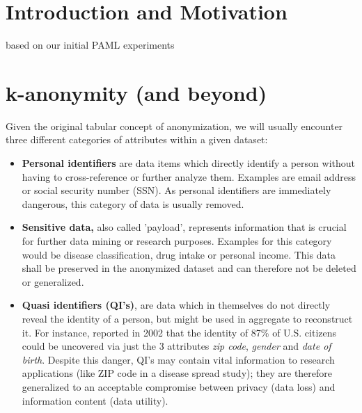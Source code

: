 \documentclass{llncs}
\begin{document}
\renewcommand{\thesubfigure}{\thefigure.\arabic{subfigure}}
\makeatletter
\renewcommand{\p@subfigure}{}
\renewcommand{\@thesubfigure}{\thesubfigure:\hskip\subfiglabelskip}
\makeatother


\section{Introduction and Motivation}
\label{sect:intro_moti}

based on our initial PAML experiments \cite{}



\section{k-anonymity (and beyond)}
\label{sect:k_anon}

Given the original tabular concept of anonymization, we will usually encounter three different categories of attributes within a given dataset:

\begin{itemize}
	\item \textbf{Personal identifiers} are data items which directly identify a person without having to cross-reference or further analyze them. Examples are email address or social security number (SSN). As personal identifiers are immediately dangerous, this category of data is usually removed.
	\item \textbf{Sensitive data,} also called 'payload', represents information that is crucial for further data mining or research purposes. Examples for this category would be disease classification, drug intake or personal income. This data shall be preserved in the anonymized dataset and can therefore not be deleted or generalized.
	\item \textbf{Quasi identifiers (QI's)}, are data which in themselves do not directly reveal the identity of a person, but might be used in aggregate to reconstruct it. For instance, \cite{sweeney2002k} reported in 2002 that the identity of 87\% of U.S. citizens could be uncovered via just the 3 attributes \textit{zip code}, \textit{gender} and \textit{date of birth}. Despite this danger, QI's may contain vital information to research applications (like ZIP code in a disease spread study); they are therefore generalized to an acceptable compromise between privacy (data loss) and information content (data utility).
\end{itemize}
\end{document}
